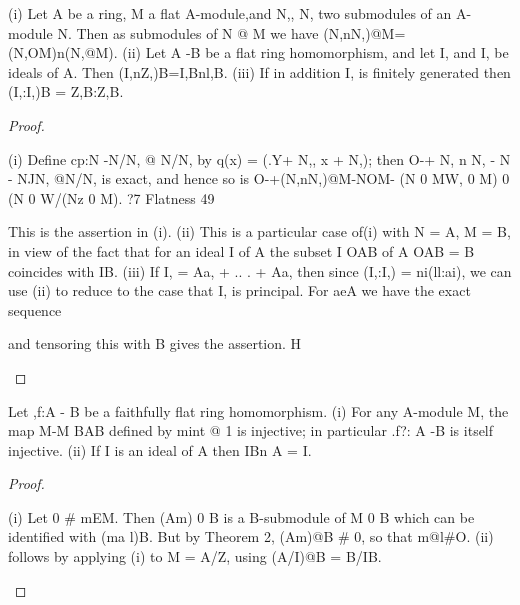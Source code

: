 \begin{theorem}[Theorem 7.4]\label{mcrt-auto-theorem-7-4}\uses{}
\begin{mathematicalrecord}
(i) Let A be a ring, M a flat A-module,and N,, N, two submodules of an
A-module       N. Then as submodules of N @ M we have
            (N,nN,)@M=(N,OM)n(N,@M).
   (ii) Let A -B            be a flat ring homomorphism,      and let I, and I, be
ideals of A. Then
            (I,nZ,)B=I,Bnl,B.
     (iii) If in addition    I, is finitely generated then
            (I,:I,)B      = Z,B:Z,B.
\end{mathematicalrecord}
\end{theorem}
\begin{proof}
\begin{mathematicalrecord}
(i) Define cp:N -N/N, @ N/N, by q(x) = (.Y+ N,, x + N,); then
O-+ N, n N, - N - NJN, @N/N, is exact, and hence so is
            O-+(N,nN,)@M-NOM-
                  (N 0 MW,         0 M) 0 (N 0 W/(Nz 0 M).
?7       Flatness                                                           49

This is the assertion in (i).
    (ii) This is a particular case of(i) with N = A, M = B, in view of the fact
that for an ideal I of A the subset I OAB of A OAB = B coincides with IB.
    (iii) If I, = Aa, + .. . + Aa, then since (I,:I,) = ni(ll:ai), we can use
(ii) to reduce to the case that I, is principal. For aeA we have the exact
sequence



and tensoring       this with B gives the assertion.   H
\end{mathematicalrecord}
\end{proof}


\begin{theorem}[Theorem 7.5]\label{mcrt-auto-theorem-7-5}\uses{}
\begin{mathematicalrecord}
Let ,f:A -        B be a faithfully flat ring homomorphism.
    (i) For any A-module M, the map M-M               BAB defined by mint @ 1
is injective; in particular .f?: A -B   is itself injective.
   (ii) If I is an ideal of A then IBn A = I.
\end{mathematicalrecord}
\end{theorem}
\begin{proof}
\begin{mathematicalrecord}
(i) Let 0 # mEM. Then (Am) 0 B is a B-submodule of M 0 B which
can be identified with (ma l)B. But by Theorem 2, (Am)@B # 0, so that
m@l#O.
   (ii) follows by applying (i) to M = A/Z, using (A/I)@B = B/IB.
\end{mathematicalrecord}
\end{proof}


